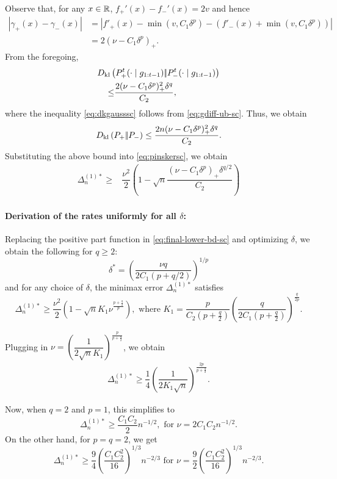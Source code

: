 Observe that, for any $x\in \mathbb{R}$, $f_+'(x) - f_-'(x) = 2v$ and hence
\begin{align}
 |\gamma_+(x) - \gamma_-(x)| 
& = | f'_+(x) - \min(v,C_1 \delta^p) - (f'_-(x)+\min(v,C_1 \delta^p)) | \nonumber \\
& = 2 (\nu - C_1 \delta^p)_+.
 \label{eq:gdiff-ub-sc}
\end{align}
From the foregoing, 
\begin{align}
 \MoveEqLeft \dkl{P_{+}^t(\cdot\mid g_{1:t-1})}{P_{-}^t(\cdot\mid g_{1:t-1})}\nonumber\\
 \le & \dfrac{2(\nu-C_1\delta^p)_+^2\delta^q}{C_2},\label{eq:dkgausssc}
\end{align}
where the inequality \eqref{eq:dkgausssc} follows from \eqref{eq:gdiff-ub-sc}.
Thus, we obtain
\begin{align}
D_{\rm kl}\left({P_{+}} |\!| {P_{-}} \right) \le \dfrac{2n(\nu-C_1\delta^p)_+^2 \delta^q}{C_2}.\label{eq:dkbd}
\end{align}
Substituting the above bound into \eqref{eq:pinskersc}, we obtain 
\begin{align}
 \Delta_n^{(1)*}
  \ge & \dfrac{\nu^2}{2} \left(1 - \sqrt{
    n}  \dfrac{(\nu-C_1\delta^p)_+\delta^{q/2}}{C_2}
  \right)\label{eq:final-lower-bd-sc}
\end{align}


\paragraph{Derivation of the rates uniformly for all $\delta$:}
Replacing the positive part function in \eqref{eq:final-lower-bd-sc} and optimizing $\delta$, we obtain the following for $q \ge 2$:
\[
\delta^*=\left(\frac{\nu q}{2C_1(p+q/2)}\right)^{1/p}
\]
and for any choice of $\delta$, the minimax error $\Delta_n^{(1)*}$ satisfies
\[
\Delta_n^{(1)*} \ge \dfrac{\nu^2}{2} \left(1 - \sqrt{n}  K_1 \nu^{\frac{p+\tfrac{q}{2}}{p}}\right), \text{ where } K_1 = \dfrac{p}{C_2(p+\tfrac{q}{2})} \left(\dfrac{q}{2C_1(p+\tfrac{q}{2})}\right)^{\frac{q}{2p}}.
\]

Plugging in $\nu = \left(\dfrac{1}{2\sqrt{n} K_1} \right)^{\frac{p}{p+\frac{q}{2}}}$, we obtain
\begin{align}
\Delta_n^{(1)*} \ge \dfrac{1}{4}\left(\dfrac{1}{2 K_1 \sqrt n}\right)^{\frac{2p}{p+\frac{q}{2}}}.
\label{eq:lb-pq}
\end{align}

Now, when $q=2$ and $p=1$, this simplifies to
\[
\Delta_n^{(1)*} \ge \dfrac{C_1 C_2}{2} n^{-1/2}, \text{ for } \nu = 2C_1C_2 n^{-1/2}.
\]
On the other hand, for $p=q=2$, we get
\[
\Delta_n^{(1)*} \ge  \frac{9}{4}\left(\frac{C_1 C_2^2}{16}\right)^{1/3} n^{-2/3} \text{ for } \nu=\frac{9}{2}\left(\frac{C_1 C_2^2}{16}\right)^{1/3}n^{-2/3}.
\]

